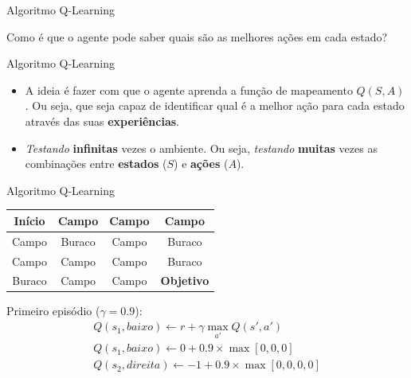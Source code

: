 \documentclass{beamer}
\begin{document}
\begin{frame}{Algoritmo Q-Learning}

	\begin{block}{}
		Como é que o agente pode saber quais são as melhores ações em cada estado?
	\end{block}
	
\end{frame}

\begin{frame}{Algoritmo Q-Learning}
	\begin{itemize}
		\item A ideia é fazer com que o agente aprenda a função de mapeamento $Q(S,A)$. 
		Ou seja, que seja capaz de identificar qual é a melhor ação para cada estado 
		através das suas \textbf{experiências}. 
		\item \textit{Testando} \textbf{infinitas} vezes o ambiente. 
		Ou seja, \textit{testando} \textbf{muitas} vezes as combinações entre 
		\textbf{estados} ($S$) e \textbf{ações} ($A$). 
	\end{itemize}

\end{frame}

\begin{frame}{Algoritmo Q-Learning}
\begin{small}
\begin{center}
	\begin{tabular}{ |c|c|c|c| } 
		\hline
		\cellcolor{red!25} Início & Campo & Campo & Campo \\ 
		\hline
		Campo & \cellcolor{black!25} Buraco & Campo &  \cellcolor{black!25} Buraco\\ 
		\hline
		 Campo & Campo & Campo & \cellcolor{black!25} Buraco\\ 
		\hline
		\cellcolor{black!25} Buraco & Campo & Campo & \textbf{Objetivo} \\ 
		\hline
	\end{tabular}
\end{center}
\end{small}

Primeiro episódio ($\gamma = 0.9$):
\begin{eqnarray}
Q(s_{1}, baixo) \leftarrow  r + \gamma \max_{a'}{Q(s', a')} \nonumber \\
Q(s_{1}, baixo) \leftarrow  0 + 0.9 \times \max[0, 0, 0] \nonumber \\
Q(s_{2}, direita) \leftarrow  -1 + 0.9 \times \max[0, 0, 0,0] \nonumber \\
\end{eqnarray}

\end{frame}
\end{document}
